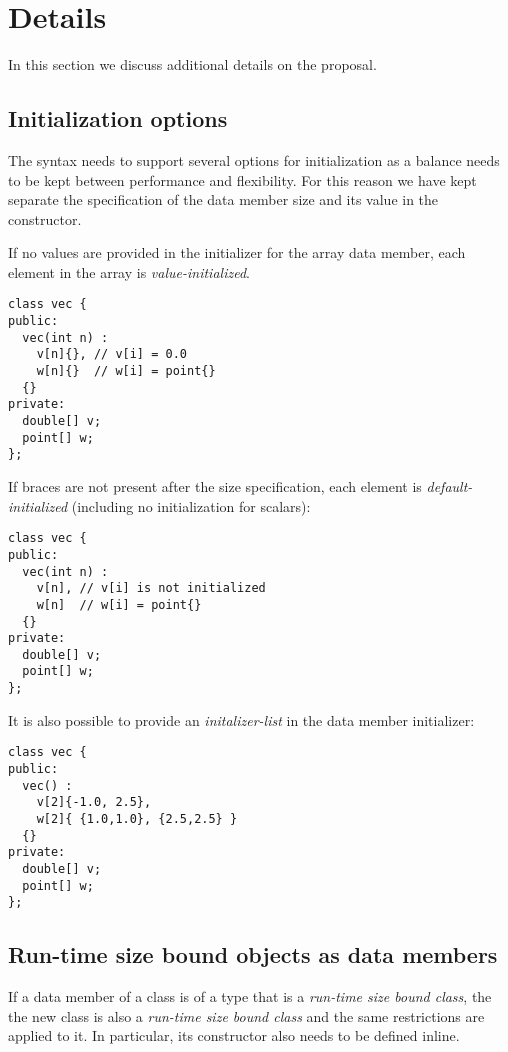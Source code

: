 \section{Details}

In this section we discuss additional details on the proposal.

\subsection{Initialization options}

The syntax needs to support several options for initialization as a balance
needs to be kept between performance and flexibility. For this reason we have
kept separate the specification of the data member size and its value in the
constructor.

If no values are provided in the initializer for the array data member, each
element in the array is \emph{value-initialized}.

\begin{lstlisting}
class vec {
public:
  vec(int n) : 
    v[n]{}, // v[i] = 0.0
    w[n]{}  // w[i] = point{}
  {}
private:
  double[] v;
  point[] w;
};
\end{lstlisting}

If braces are not present after the size specification, each element is
\emph{default-initialized} (including no initialization for scalars):


\begin{lstlisting}
class vec {
public:
  vec(int n) : 
    v[n], // v[i] is not initialized
    w[n]  // w[i] = point{}
  {}
private:
  double[] v;
  point[] w;
};
\end{lstlisting}

It is also possible to provide an \emph{initalizer-list} in the data member initializer:

\begin{lstlisting}
class vec {
public:
  vec() : 
    v[2]{-1.0, 2.5}, 
    w[2]{ {1.0,1.0}, {2.5,2.5} }
  {}
private:
  double[] v;
  point[] w;
};
\end{lstlisting}

\subsection{Run-time size bound objects as data members}

If a data member of a class is of a type that is a \emph{run-time size bound class}, the the new 
class is also a \emph{run-time size bound class} and the same restrictions are
applied to it. In particular, its constructor also needs to be defined inline.

